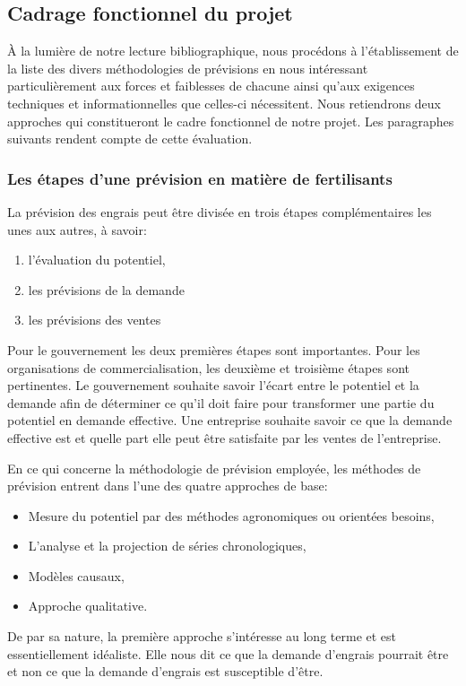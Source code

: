 	\subsection{Cadrage fonctionnel du projet}
	À la lumière de notre lecture bibliographique, nous procédons à l'établissement de la liste des divers méthodologies de prévisions en nous intéressant particulièrement aux forces et faiblesses de chacune ainsi qu'aux exigences techniques et informationnelles que celles-ci nécessitent. Nous retiendrons deux approches qui constitueront le cadre fonctionnel de notre projet. Les paragraphes suivants rendent compte de cette évaluation.
	\subsubsection{Les étapes d'une prévision en matière de fertilisants}
	La prévision des engrais peut être divisée en trois étapes complémentaires les unes aux autres, à savoir:\begin{enumerate}
	\item l'évaluation du potentiel,
	\item les prévisions de la demande
	\item les prévisions des ventes
	\end{enumerate}
	Pour le gouvernement les deux premières étapes sont importantes. Pour les organisations de commercialisation, les deuxième et troisième étapes sont pertinentes. Le gouvernement souhaite savoir l'écart entre le potentiel et la demande afin de déterminer ce qu'il doit faire pour transformer une partie du potentiel en demande effective. Une entreprise souhaite savoir ce que la demande effective est et quelle part elle peut être satisfaite par les ventes de l'entreprise.\par
	En ce qui concerne la méthodologie de prévision employée, les méthodes de prévision entrent dans l'une des quatre approches de base:\begin{itemize}
	\item Mesure du potentiel par des méthodes agronomiques ou orientées besoins, 
	\item L'analyse et la projection de séries chronologiques,
	\item Modèles causaux,
	\item Approche qualitative.
	\end{itemize}\par
	De par sa nature, la première approche s’intéresse au long terme et est essentiellement idéaliste. Elle nous dit ce que la demande d'engrais pourrait être et non ce que la demande d'engrais est susceptible d'être.\par
